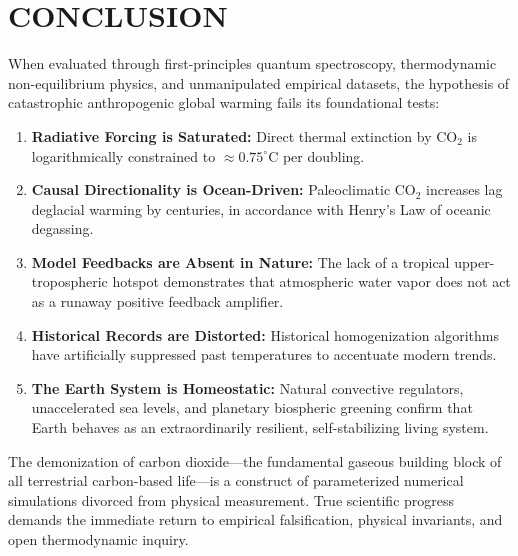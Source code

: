 \documentclass[10pt,twocolumn]{article}
\begin{document}
\section{CONCLUSION}

When evaluated through first-principles quantum spectroscopy, thermodynamic non-equilibrium physics, and unmanipulated empirical datasets, the hypothesis of catastrophic anthropogenic global warming fails its foundational tests:

\begin{enumerate}
  \item \textbf{Radiative Forcing is Saturated:} Direct thermal extinction by $\text{CO}_2$ is logarithmically constrained to $\approx 0.75^\circ\text{C}$ per doubling.
  \item \textbf{Causal Directionality is Ocean-Driven:} Paleoclimatic $\text{CO}_2$ increases lag deglacial warming by centuries, in accordance with Henry’s Law of oceanic degassing.
  \item \textbf{Model Feedbacks are Absent in Nature:} The lack of a tropical upper-tropospheric hotspot demonstrates that atmospheric water vapor does not act as a runaway positive feedback amplifier.
  \item \textbf{Historical Records are Distorted:} Historical homogenization algorithms have artificially suppressed past temperatures to accentuate modern trends.
  \item \textbf{The Earth System is Homeostatic:} Natural convective regulators, unaccelerated sea levels, and planetary biospheric greening confirm that Earth behaves as an extraordinarily resilient, self-stabilizing living system.
\end{enumerate}

The demonization of carbon dioxide—the fundamental gaseous building block of all terrestrial carbon-based life—is a construct of parameterized numerical simulations divorced from physical measurement. True scientific progress demands the immediate return to empirical falsification, physical invariants, and open thermodynamic inquiry.
\end{document}
